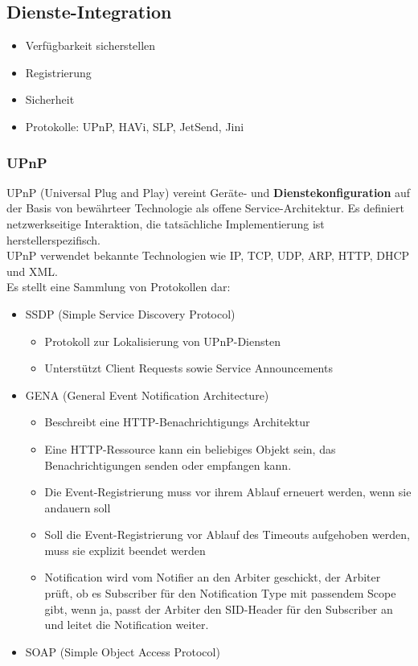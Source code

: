 \documentclass{article} %
\begin{document}
\subsection{Dienste-Integration}	
	\begin{itemize}
	\item Verfügbarkeit sicherstellen 
	\item Registrierung
	\item Sicherheit 
	\item Protokolle: UPnP, HAVi, SLP, JetSend, Jini 
	\end{itemize}
	
	\subsubsection{UPnP}
	UPnP (Universal Plug and Play) vereint Geräte- und \textbf{Dienstekonfiguration} auf der Basis von bewährteer Technologie als offene Service-Architektur. Es definiert netzwerkseitige Interaktion, die tatsächliche Implementierung ist herstellerspezifisch.\\
	UPnP verwendet bekannte Technologien wie IP, TCP, UDP, ARP, HTTP, DHCP und XML.\\
	Es stellt eine Sammlung von Protokollen dar:
		\begin{itemize}
		\item SSDP (Simple Service Discovery Protocol)
			\begin{itemize}
			\item Protokoll zur Lokalisierung von UPnP-Diensten
			\item Unterstützt Client Requests sowie Service Announcements 
			\end{itemize}
		\item GENA (General Event Notification Architecture)
			\begin{itemize}
			\item Beschreibt eine HTTP-Benachrichtigungs Architektur
			\item Eine HTTP-Ressource kann ein beliebiges Objekt sein, das Benachrichtigungen senden oder empfangen kann.
			\item Die Event-Registrierung muss vor ihrem Ablauf erneuert werden, wenn sie andauern soll
			\item Soll die Event-Registrierung vor Ablauf des Timeouts aufgehoben werden, muss sie explizit beendet werden
			\item Notification wird vom Notifier an den Arbiter geschickt, der Arbiter prüft, ob es Subscriber für den Notification Type mit 
			passendem Scope gibt, wenn ja, passt der Arbiter den SID-Header für den Subscriber an und leitet die Notification weiter. 
			\end{itemize}
		\item SOAP (Simple Object Access Protocol)
		\end{itemize}
\end{document}
